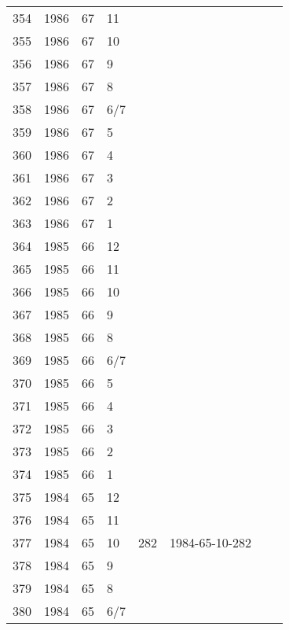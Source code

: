 \begin{longtable}{ |l|l|l|l|l|l|l|l| }
354 & 1986 & 67 &    11 &         &                &  & \\
355 & 1986 & 67 &    10 &         &                &  & \\
356 & 1986 & 67 &     9 &         &                &  & \\
357 & 1986 & 67 &     8 &         &                &  & \\
358 & 1986 & 67 &   6/7 &         &                &  & \\
359 & 1986 & 67 &     5 &         &                &  & \\
360 & 1986 & 67 &     4 &         &                &  & \\
361 & 1986 & 67 &     3 &         &                &  & \\
362 & 1986 & 67 &     2 &         &                &  & \\
363 & 1986 & 67 &     1 &         &                &  & \\
364 & 1985 & 66 &    12 &         &                &  & \\
365 & 1985 & 66 &    11 &         &                &  & \\
366 & 1985 & 66 &    10 &         &                &  & \\
367 & 1985 & 66 &     9 &         &                &  & \\
368 & 1985 & 66 &     8 &         &                &  & \\
369 & 1985 & 66 &   6/7 &         &                &  & \\
370 & 1985 & 66 &     5 &         &                &  & \\
371 & 1985 & 66 &     4 &         &                &  & \\
372 & 1985 & 66 &     3 &         &                &  & \\
373 & 1985 & 66 &     2 &         &                &  & \\
374 & 1985 & 66 &     1 &         &                &  & \\
375 & 1984 & 65 &    12 &         &                &  & \\
376 & 1984 & 65 &    11 &         &                &  & \\
377 & 1984 & 65 &    10 &     282 & 1984-65-10-282 &  & \\
378 & 1984 & 65 &     9 &         &                &  & \\
379 & 1984 & 65 &     8 &         &                &  & \\
380 & 1984 & 65 &   6/7 &         &                &  & \\

\end{longtable}
